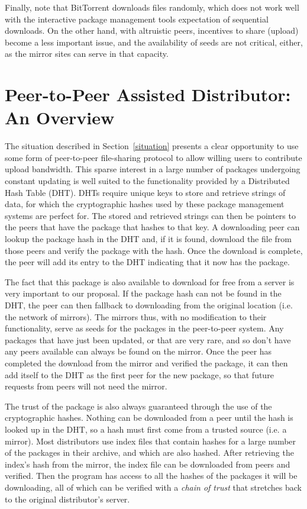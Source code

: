 \documentclass[conference]{IEEEtran}
\begin{document}
Finally, note that BitTorrent downloads files
randomly, which does not work well with the interactive package
management tools expectation of sequential downloads. On the other hand, with altruistic peers, incentives to share (upload) 
become a less important issue, and the availability of seeds are not critical, either, as the mirror sites 
can serve in that capacity.




\section{Peer-to-Peer Assisted Distributor: An Overview}
\label{opportunity}

The situation described in Section~\ref{situation} presents a clear
opportunity to use some form of peer-to-peer file-sharing protocol
to allow willing users to contribute upload bandwidth. This sparse
interest in a large number of packages undergoing constant updating
is well suited to the functionality provided by a Distributed Hash
Table (DHT). DHTs require unique keys to store and retrieve strings
of data, for which the cryptographic hashes used by these package
management systems are perfect for. The stored and retrieved strings
can then be pointers to the peers that have the package that hashes
to that key. A downloading peer can lookup the package hash in the
DHT and, if it is found, download the file from those peers and
verify the package with the hash. Once the download is complete, the
peer will add its entry to the DHT indicating that it now has the
package.

The fact that this package is also available to download for free
from a server is very important to our proposal. If the package hash
can not be found in the DHT, the peer can then fallback to
downloading from the original location (i.e. the network of
mirrors). The mirrors thus, with no modification to their
functionality, serve as seeds for the packages in the peer-to-peer
system. Any packages that have just been updated, or that are very
rare, and so don't have any peers available can always be found on
the mirror. Once the peer has completed the download from the mirror
and verified the package, it can then add itself to the DHT as the
first peer for the new package, so that future requests from peers
will not need the mirror.

The trust of the package is also always guaranteed through the use
of the cryptographic hashes. Nothing can be downloaded from a peer
until the hash is looked up in the DHT, so a hash must first come
from a trusted source (i.e. a mirror). Most distributors use index
files that contain hashes for a large number of the packages in
their archive, and which are also hashed. After retrieving the
index's hash from the mirror, the index file can be downloaded from
peers and verified. Then the program has access to all the hashes of
the packages it will be downloading, all of which can be verified
with a \emph{chain of trust} that stretches back to the original
distributor's server.
\end{document}
